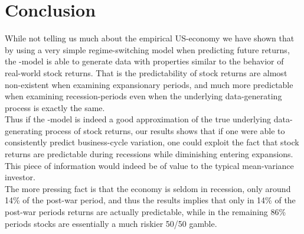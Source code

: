 \section{Conclusion} \label{sec:Conclusion}
While not telling us much about the empirical US-economy we have shown that by using a very simple regime-switching model when predicting future returns, the \citet{Campbell1999}-model is able to generate data with properties similar to the behavior of real-world stock returns. That is the predictability of stock returns are almost non-existent when examining expansionary periods, and much more predictable when examining recession-periods even when the underlying data-generating process is exactly the same. \\
Thus if the \citet{Campbell1999}-model is indeed a good approximation of the true underlying data-generating process of stock returns, our results shows that if one were able to consistently predict business-cycle variation, one could exploit the fact that stock returns are predictable during recessions while diminishing entering expansions. This piece of information would indeed be of value to the typical mean-variance investor.\\
The more pressing fact is that the economy is seldom in recession, only around 14\% of the post-war period, and thus the results implies that only in 14\% of the post-war periods returns are actually predictable, while in the remaining 86\% periods stocks are essentially a much riskier 50/50 gamble.